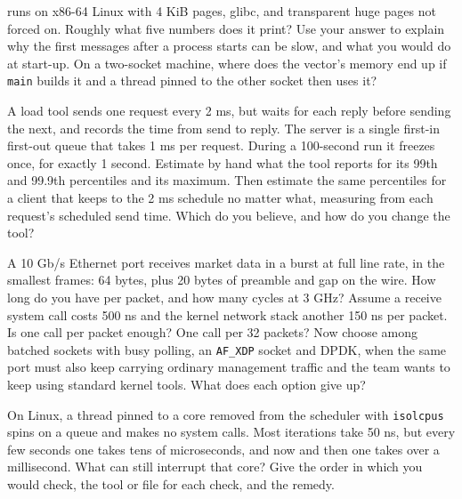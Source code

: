 \begin{question}\label{iq:iv3:low-latency:25}
 runs on x86-64 Linux with 4 KiB pages, glibc, and transparent huge pages not forced on. Roughly what five numbers does it print? Use your answer to explain why the first messages after a process starts can be slow, and what you would do at start-up. On a two-socket machine, where does the vector's memory end up if \texttt{main} builds it and a thread pinned to the other socket then uses it?
\label{lst:iv3:ll:firsttouch}
\end{question}

\begin{question}\label{iq:iv3:low-latency:26}
A load tool sends one request every 2 ms, but waits for each reply before sending the next, and records the time from send to reply. The server is a single first-in first-out queue that takes 1 ms per request. During a 100-second run it freezes once, for exactly 1 second. Estimate by hand what the tool reports for its 99th and 99.9th percentiles and its maximum. Then estimate the same percentiles for a client that keeps to the 2 ms schedule no matter what, measuring from each request's scheduled send time. Which do you believe, and how do you change the tool?
\end{question}

\begin{question}\label{iq:iv3:low-latency:27}
A 10 Gb/s Ethernet port receives market data in a burst at full line rate, in the smallest frames: 64 bytes, plus 20 bytes of preamble and gap on the wire. How long do you have per packet, and how many cycles at 3 GHz? Assume a receive system call costs 500 ns and the kernel network stack another 150 ns per packet. Is one call per packet enough? One call per 32 packets? Now choose among batched sockets with busy polling, an \texttt{AF\_XDP} socket and DPDK, when the same port must also keep carrying ordinary management traffic and the team wants to keep using standard kernel tools. What does each option give up?
\end{question}

\begin{question}\label{iq:iv3:low-latency:28}
On Linux, a thread pinned to a core removed from the scheduler with \texttt{isolcpus} spins on a queue and makes no system calls. Most iterations take 50 ns, but every few seconds one takes tens of microseconds, and now and then one takes over a millisecond. What can still interrupt that core? Give the order in which you would check, the tool or file for each check, and the remedy.
\end{question}

